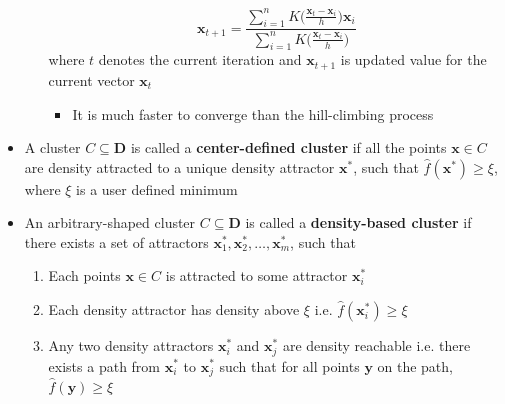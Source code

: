 \documentclass[a4, english]{article}
\begin{document}
\begin{itemize}
\begin{itemize}
\begin{equation*}
      \pmb x_{t+1} = \frac{\sum_{i=1}^nK\big(\frac{\pmb x_t-\pmb x_i}{h}\big) \pmb x_i}{\sum_{i=1}^nK\big(\frac{\pmb x_t-\pmb x_i}{h}\big)}
    \end{equation*}
    where $t$ denotes the current iteration and $\pmb x_{t+1}$ is updated value for the current vector $\pmb x_t$
    \begin{itemize}
    	\item It is much faster to converge than the hill-climbing process
    \end{itemize}
  \end{itemize}
  \item A cluster $C \subseteq \mathbf D$ is called a \textbf{center-defined cluster} if all the points $\pmb x \in C$ are density attracted to a unique density attractor $\pmb x^*$, such that $\hat f (\pmb x^*) \geq \xi$, where $\xi$ is a user defined minimum 
  \item An arbitrary-shaped cluster $C \subseteq \mathbf D$ is called a \textbf{density-based cluster} if there exists a set of attractors $\pmb x_1^*, \pmb x_2^*, \dots, \pmb x_m^*$, such that 
  \begin{enumerate}
    \item Each points $\pmb x \in C$ is attracted to some attractor $\pmb x_i^*$
    \item Each density attractor has density above $\xi$ i.e. $\hat f (\pmb x_i^*) \geq \xi$
    \item Any two density attractors $\pmb x_i^*$ and $\pmb x_j^*$ are density reachable i.e. there exists a path from $\pmb x_i^*$ to $\pmb x_j^*$ such that for all points $\pmb y$ on the path, $\hat f(\pmb y) \geq \xi$ 
  \end{enumerate}
\end{itemize}
\end{document}
